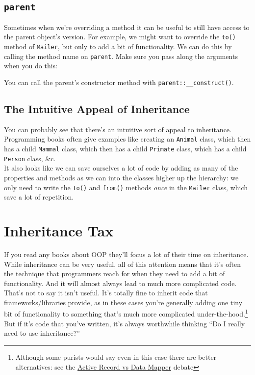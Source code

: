 \subsection{\texttt{parent}}

Sometimes when we're overriding a method it can be useful to still have access to the parent object's version. For example, we might want to override the \texttt{to()} method of \texttt{Mailer}, but only to add a bit of functionality. We can do this by calling the method name on \texttt{parent}. Make sure you pass along the arguments when you do this:


You can call the parent's constructor method with \texttt{parent::\_\_construct()}.


\subsection{The Intuitive Appeal of Inheritance}

You can probably see that there's an intuitive sort of appeal to inheritance. Programming books often give examples like creating an \texttt{Animal} class, which then has a child \texttt{Mammal} class, which then has a child \texttt{Primate} class, which has a child \texttt{Person} class, \&c.
\\

It also looks like we can save ourselves a lot of code by adding as many of the properties and methods as we can into the classes higher up the hierarchy: we only need to write the \texttt{to()} and \texttt{from()} methods \textit{once} in the \texttt{Mailer} class, which save a lot of repetition.

\section{Inheritance Tax}


If you read any books about OOP they'll focus a lot of their time on inheritance. While inheritance can be very useful, all of this attention means that it's often the technique that programmers reach for when they need to add a bit of functionality. And it will almost always lead to much more complicated code.
\\

That's not to say it isn't useful. It's totally fine to inherit code that frameworks/libraries provide, as in these cases you're generally adding one tiny bit of functionality to something that's much more complicated under-the-hood.\footnote{Although some purists would say even in this case there are better alternatives: see the \href{https://www.thoughtfulcode.com/orm-active-record-vs-data-mapper/}{Active Record vs Data Mapper} debate} But if it's code that you've written, it's always worthwhile thinking ``Do I really need to use inheritance?''
\\


